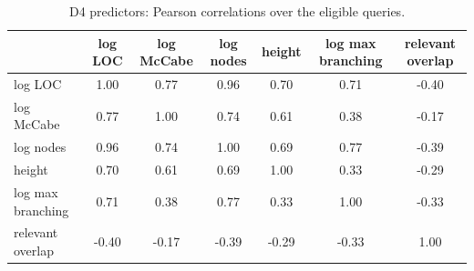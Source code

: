 \begin{table}[!htbp]
\centering
\caption{D4 predictors: Pearson correlations over the eligible queries.}
\label{tab:d4corr}
\scriptsize
\setlength{\tabcolsep}{2.5pt}
\begin{tabular}{lcccccc}
\toprule
 & log LOC & log McCabe & log nodes & height & log max branching & relevant overlap \\
\midrule
log LOC & 1.00 & 0.77 & 0.96 & 0.70 & 0.71 & -0.40 \\
log McCabe & 0.77 & 1.00 & 0.74 & 0.61 & 0.38 & -0.17 \\
log nodes & 0.96 & 0.74 & 1.00 & 0.69 & 0.77 & -0.39 \\
height & 0.70 & 0.61 & 0.69 & 1.00 & 0.33 & -0.29 \\
log max branching & 0.71 & 0.38 & 0.77 & 0.33 & 1.00 & -0.33 \\
relevant overlap & -0.40 & -0.17 & -0.39 & -0.29 & -0.33 & 1.00 \\
\bottomrule
\end{tabular}
\end{table}
